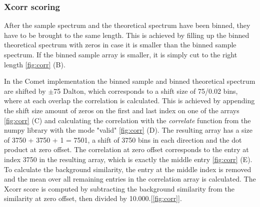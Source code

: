 \documentclass[11pt]{article}
\begin{document}
\subsubsection{Xcorr scoring}
After the sample spectrum and the theoretical spectrum have been binned, they have to be brought to the same length. This is achieved by filling up the binned theoretical spectrum with zeros in case it is smaller than the binned sample spectrum. If the binned sample array is smaller, it is simply cut to the right length \cref{fig:corr} (B).

In the Comet implementation the binned sample and binned theoretical spectrum are shifted by $\pm$75 Dalton, which corresponds to a shift size of 75/0.02 bins, where at each overlap the correlation is calculated. This is achieved by appending the shift size amount of zeros on the first and last index on one of the arrays \cref{fig:corr} (C) and calculating the correlation with the \textit{correlate} function from the numpy library with the mode "valid" \cref{fig:corr} (D). The resulting array has a size of 3750 + 3750 + 1 = 7501, a shift of 3750 bins in each direction and the dot product at zero offset. The correlation at zero offset corresponds to the entry at index 3750 in the resulting array, which is exactly the middle entry \cref{fig:corr} (E). To calculate the background similarity, the entry at the middle index is removed and the mean over all remaining entries in the correlation array is calculated. The Xcorr score is computed by subtracting the background similarity from the similarity at zero offset, then divided by 10.000.[\cref{fig:corr}].
\end{document}
